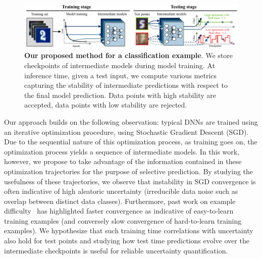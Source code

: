\begin{figure}[t]
    \centering
    \includegraphics[width=0.97\linewidth]{figs/sptd/nntd.pdf}
    \caption[Our proposed \sptd method for a classification example]{\textbf{Our proposed \sptd method for a classification example}. We store checkpoints of intermediate models during model training. At inference time, given a test input, we compute various metrics capturing the stability of intermediate predictions with respect to the final model prediction. Data points with high stability are accepted, data points with low stability are rejected.}
    \label{fig:nntd_overview}
\end{figure}

Our approach builds on the following observation: typical DNNs are trained using an iterative optimization procedure, \eg using Stochastic Gradient Descent (SGD). Due to the sequential nature of this optimization process, as training goes on, the optimization process yields a sequence of intermediate models. 
In this work, however, we propose to take advantage of the information contained in these optimization trajectories for the purpose of selective prediction. By studying the usefulness of these trajectories, we observe that instability in SGD convergence is often indicative of high aleatoric uncertainty (\ie irreducible data noise such as overlap between distinct data classes). Furthermore, past work on example difficulty~\citep{jiang2020characterizing,toneva2018empirical,hooker2019compressed,agarwal2020estimating} has highlighted faster convergence as indicative of easy-to-learn training examples (and conversely slow convergence of hard-to-learn training examples). We hypothesize that such training time correlations with uncertainty also hold for test points and studying how test time predictions evolve over the intermediate checkpoints is useful for reliable uncertainty quantification.

